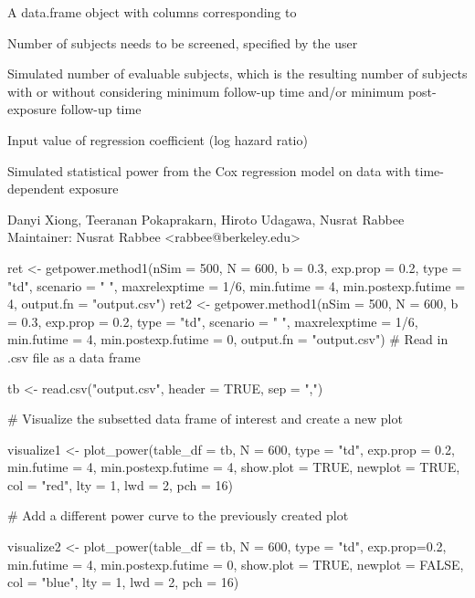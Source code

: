 \documentclass[a4paper]{book}
\begin{document}
%
\begin{Value}
A data.frame object with columns corresponding to
\begin{ldescription}
\item[\code{i\_N}] Number of subjects needs to be screened, specified by the user
\item[\code{N\_eff}] Simulated number of evaluable subjects, which is the resulting number of
subjects with or without considering minimum follow-up time and/or minimum post-exposure follow-up time
\item[\code{i\_beta}] Input value of regression coefficient (log hazard ratio)
\item[\code{pow}] Simulated statistical power from the Cox regression model on data with
time-dependent exposure
\end{ldescription}
\end{Value}
%
\begin{Author}\relax
Danyi Xiong, Teeranan Pokaprakarn, Hiroto Udagawa, Nusrat Rabbee \\{}
Maintainer: Nusrat Rabbee <rabbee@berkeley.edu>
\end{Author}
%
\begin{Examples}
\begin{ExampleCode}
ret <- getpower.method1(nSim = 500, N = 600, b = 0.3, exp.prop = 0.2, type = "td", scenario = 
" ", maxrelexptime = 1/6, min.futime = 4, min.postexp.futime = 4,
output.fn = "output.csv")
ret2 <- getpower.method1(nSim = 500, N = 600, b = 0.3, exp.prop = 0.2, type = "td", scenario = 
" ", maxrelexptime = 1/6, min.futime = 4, min.postexp.futime = 0,
output.fn = "output.csv")
# Read in .csv file as a data frame

  tb <-  read.csv("output.csv", header = TRUE, sep = ",")

	# Visualize the subsetted data frame of interest and create a new plot

visualize1 <- plot_power(table_df = tb, N = 600, type = "td", exp.prop = 0.2,
min.futime = 4, min.postexp.futime = 4, show.plot = TRUE, newplot = TRUE, col = "red", lty = 1, lwd = 2, pch = 16)

# Add a different power curve to the previously created plot

visualize2 <- plot_power(table_df = tb, N = 600, type = "td", exp.prop=0.2,
min.futime = 4, min.postexp.futime = 0, show.plot = TRUE, newplot = FALSE, col = "blue", lty = 1, lwd = 2, pch = 16)
\end{ExampleCode}
\end{Examples}
\end{document}
